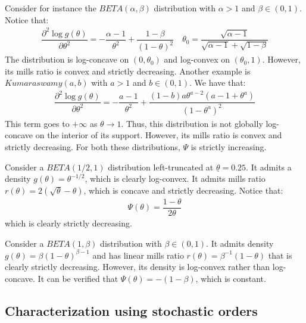 \begin{example} Consider for instance the $BETA(\alpha,\beta)$ distribution with $\alpha>1$ and $\beta\in (0,1)$. Notice that:
\begin{align*}
  \dfrac{\partial^2 \log g(\theta)}{\partial \theta^2} = -\dfrac{\alpha-1}{\theta^2} + \dfrac{1-\beta}{(1-\theta)^2} \quad \theta_0 = \dfrac{\sqrt{\alpha-1}}{\sqrt{\alpha-1}+\sqrt{1-\beta}} 
\end{align*}
The distribution is log-concave on $(0,\theta_0)$ and log-convex on $(\theta_0,1)$. However, its mills ratio is convex and strictly decreasing. Another example is $Kumaraswamy(a,b)$ with $a>1$ and $b\in(0,1)$. We have that:
\begin{align*}
     \dfrac{\partial^2 \log g(\theta)}{\partial \theta^2} = -\dfrac{a-1}{\theta^2} + \dfrac{(1-b)a\theta^{a-2}(a-1+\theta^a)}{(1-\theta^a)^2}
\end{align*} 
This term goes to $+\infty$ as $\theta\rightarrow 1$. Thus, this distribution is not globally log-concave on the interior of its support. However, its mills ratio is convex and strictly decreasing. For both these distributions, $\Psi$ is strictly increasing. 
\end{example}

\begin{example} 
Consider a $BETA(1/2, 1)$ distribution left-truncated at $\underline{\theta} = 0.25$. It admits a density $g(\theta) = \theta^{-1/2}$, which is clearly log-convex. It admits mills ratio $r(\theta) = 2(\sqrt{\theta} - \theta)$, which is concave and strictly decreasing. Notice that:
\begin{align*}
  \Psi(\theta) = \dfrac{1-\theta}{2\theta}
\end{align*}
which is clearly strictly decreasing.
\end{example}

\begin{example}
Consider a $BETA(1,\beta)$ distribution with $\beta\in(0,1)$. It admits density $g(\theta) = \beta(1-\theta)^{\beta-1}$ and has linear mills ratio $r(\theta) = \beta^{-1}(1-\theta)$ that is clearly strictly decreasing. However, its density is log-convex rather than log-concave. It can be verified that $\Psi(\theta) = -(1-\beta)$, which is constant. 
\end{example}

\subsection{Characterization using stochastic orders}

